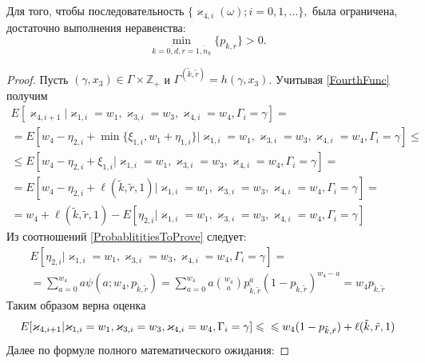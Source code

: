 \documentclass{report}
\begin{document}
\begin{theorem}
Для того, чтобы последовательность $\{\varkappa_{4,i}(\omega); i =0, 1, \ldots\},$ была ограничена, достаточно выполнения неравенства:
\begin{equation*}
    \min_{k=\overline{0,d}, r=\overline{1,n_k}} {\{p_{k,r}\}} > 0.
\end{equation*}
\end{theorem}
\begin{proof}
Пусть $(\gamma, x_3) \in \Gamma \times {\mathbb Z}_+$ и  $\Gamma^{(\tilde{k},\tilde{r})}=h(\gamma,x_3)$. Учитывая \eqref{FourthFunc} получим
\begin{multline*}
    E[\varkappa_{4,i+1} | \varkappa_{1,i}=w_1,\varkappa_{3,i}=w_3, \varkappa_{4,i}=w_4, \Gamma_i=\gamma] = \\
    =
    E[w_4 - \eta_{2,i} +  \min{\{\xi_{1,i}, w_1 + \eta_{1,i} \}} | \varkappa_{1,i}=w_1,\varkappa_{3,i}=w_3, \varkappa_{4,i}=w_4, \Gamma_i=\gamma] \leqslant \\
    \leqslant
     E[w_4 - \eta_{2,i} +  \xi_{1,i} | \varkappa_{1,i}=w_1,\varkappa_{3,i}=w_3, \varkappa_{4,i}=w_4, \Gamma_i=\gamma] =\\ 
     = 
     E[w_4 - \eta_{2,i} +  \ell(\tilde{k},\tilde{r},1) | \varkappa_{1,i}=w_1,\varkappa_{3,i}=w_3, \varkappa_{4,i}=w_4, \Gamma_i=\gamma] = \\ 
    =
   w_4 + \ell(\tilde{k},\tilde{r},1)  -  E[\eta_{2,i} | \varkappa_{1,i}=w_1,\varkappa_{3,i}=w_3, \varkappa_{4,i}=w_4, \Gamma_i=\gamma] 
\end{multline*}
Из соотношений \eqref{ProbablititiesToProve} следует:
\begin{multline*}
  E[\eta_{2,i} | \varkappa_{1,i}=w_1,\varkappa_{3,i}=w_3, \varkappa_{4,i}=w_4, \Gamma_i=\gamma]
= \\
=
\sum_{a=0}^{w_4}  a \psi(a;w_4, p_{\tilde{k},\tilde{r}}) = 
\sum_{a=0}^{w_4} a {{w_4}\choose{a}} p_{\tilde{k},\tilde{r}}^a (1-p_{\tilde{k},\tilde{r}})^{w_4-a} = w_4 p_{\tilde{k},\tilde{r}} 
\end{multline*}
Таким образом верна оценка 
\begin{equation*}
     E[\varkappa_{4,i+1} | \varkappa_{1,i}=w_1,\varkappa_{3,i}=w_3, \varkappa_{4,i}=w_4, \Gamma_i=\gamma] \leqslant \\ 
     \leqslant
     w_4 (1-p_{\tilde{k},\tilde{r}}) + \ell(\tilde{k},\tilde{r},1)
\end{equation*}
Далее по формуле полного математического ожидания:

\end{proof}
\end{document}
